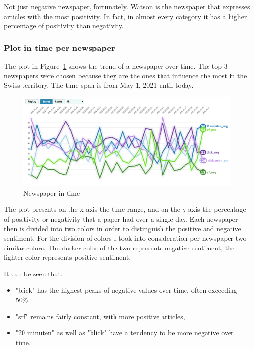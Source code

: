 Not just negative newspaper, fortunately. Watson is the newspaper that expresses articles with the most positivity. In fact, in almost every category it has a higher percentage of positivity than negativity.


\subsubsection{Plot in time per newspaper} 
The \gls{plot} in Figure~\ref{fig:fig_timenews} shows the trend of a newspaper over time.
The top 3 newspapers were chosen because they are the ones that influence the most in the Swiss territory.
The time span is from May 1, 2021 until today.

\begin{figure}[H]
 \includegraphics[width=1.2\textwidth,center]{images/POSneg.png}
\caption{Newspaper in time}
\label{fig:fig_timenews}
\end{figure}
\FloatBarrier

The \gls{plot} presents on the x-axis the time range, and on the y-axis the percentage of positivity or negativity that a paper had over a single day.
Each newspaper then is divided into two colors in order to distinguish the positive and negative sentiment. For the division of colors I took into consideration per newspaper two similar colors. The darker color of the two represents negative sentiment, the lighter color represents positive sentiment.

It can be seen that:
\begin{itemize}
    \item "blick" has the highest peaks of negative values over time, often exceeding 50\%.
    \item "srf" remains fairly constant, with more positive articles,
    \item "20 minuten" as well as "blick" have a tendency to be more negative over time.
\end{itemize}


